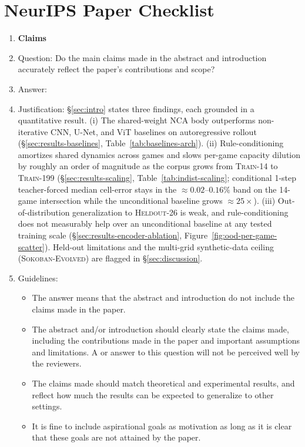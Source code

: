 \section*{NeurIPS Paper Checklist}

\begin{enumerate}

\item {\bf Claims}
    \item[] Question: Do the main claims made in the abstract and introduction accurately reflect the paper's contributions and scope?
    \item[] Answer: \answerYes{}
    \item[] Justification: \S\ref{sec:intro} states three findings, each grounded in a quantitative result.
    (i) The shared-weight NCA body outperforms non-iterative CNN, U-Net, and ViT baselines on autoregressive rollout (\S\ref{sec:results-baselines}, Table~\ref{tab:baselines-arch}).
    (ii) Rule-conditioning amortizes shared dynamics across games and slows per-game capacity dilution by roughly an order of magnitude as the corpus grows from \textsc{Train-14} to \textsc{Train-199} (\S\ref{sec:results-scaling}, Table~\ref{tab:indist-scaling}; conditional 1-step teacher-forced median cell-error stays in the $\approx 0.02$--$0.16\%$ band on the 14-game intersection while the unconditional baseline grows $\approx 25\times$).
    (iii) Out-of-distribution generalization to \textsc{Heldout-26} is weak, and rule-conditioning does not measurably help over an unconditional baseline at any tested training scale (\S\ref{sec:results-encoder-ablation}, Figure~\ref{fig:ood-per-game-scatter}).
    Held-out limitations and the multi-grid synthetic-data ceiling (\textsc{Sokoban-Evolved}) are flagged in \S\ref{sec:discussion}.
    \item[] Guidelines:
    \begin{itemize}
        \item The answer \answerNA{} means that the abstract and introduction do not include the claims made in the paper.
        \item The abstract and/or introduction should clearly state the claims made, including the contributions made in the paper and important assumptions and limitations. A \answerNo{} or \answerNA{} answer to this question will not be perceived well by the reviewers.
        \item The claims made should match theoretical and experimental results, and reflect how much the results can be expected to generalize to other settings.
        \item It is fine to include aspirational goals as motivation as long as it is clear that these goals are not attained by the paper.
    \end{itemize}


\end{enumerate}
